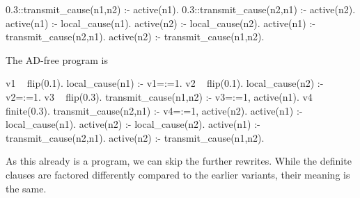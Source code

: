 \begin{example}
\begin{problog}
0.3::transmit_cause(n1,n2) :- active(n1).
0.3::transmit_cause(n2,n1) :- active(n2).
active(n1) :- local_cause(n1).
active(n2) :- local_cause(n2).
active(n1) :- transmit_cause(n2,n1).
active(n2) :- transmit_cause(n1,n2).
	\end{problog}
	The AD-free program is
	\begin{problog}
v1 ~ flip(0.1).
local_cause(n1) :- v1=:=1.
v2 ~ flip(0.1).
local_cause(n2) :- v2=:=1.
v3 ~ flip(0.3).
transmit_cause(n1,n2) :- v3=:=1, active(n1).
v4 ~ finite(0.3).
transmit_cause(n2,n1) :- v4=:=1, active(n2).
active(n1) :- local_cause(n1).
active(n2) :- local_cause(n2).
active(n1) :- transmit_cause(n2,n1).
active(n2) :- transmit_cause(n1,n2).
	\end{problog}
	As this already is a \dfplpsty program, we can skip the further rewrites. While the definite clauses are factored differently compared to the earlier variants, their meaning is the same. 
\end{example}